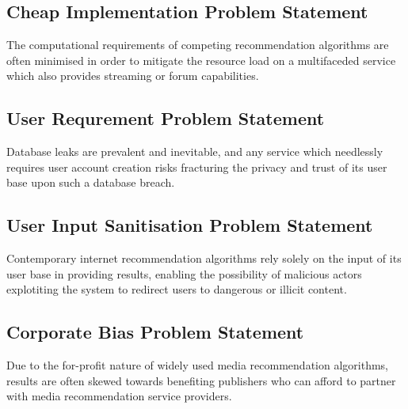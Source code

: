 \documentclass{article}
\begin{document}
\subsection{Cheap Implementation Problem Statement}
The computational requirements of competing recommendation algorithms are
often minimised in order to mitigate the resource load on a multifaceded
service which also provides streaming or forum capabilities.
\subsection{User Requrement Problem Statement}
Database leaks are prevalent and inevitable, and any service which needlessly
requires user account creation risks fracturing the privacy and trust of its
user base upon such a database breach.
\subsection{User Input Sanitisation Problem Statement}
Contemporary internet recommendation algorithms rely solely on the input
of its user base in providing results, enabling the possibility of malicious
actors explotiting the system to redirect users to dangerous or illicit content.
\subsection{Corporate Bias Problem Statement}
Due to the for-profit nature of widely used media recommendation algorithms,
results are often skewed towards benefiting publishers who can afford to
partner with media recommendation service providers.
\end{document}
